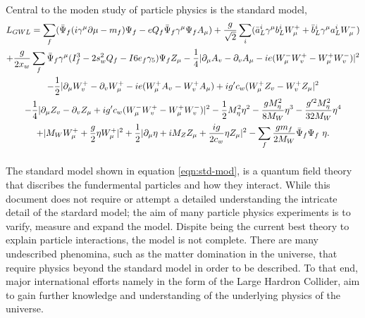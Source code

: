     Central to the moden study of particle physics is the standard model,
    \begin{multline} \label{eqn:std-mod}
      L_{GWL} = \sum_{f} ( \bar{\Psi}_{f} ( i \gamma^\mu \partial \mu - m_{f} ) \Psi_{f} - eQ_{f} \bar{\Psi}_{f} \gamma^\mu \Psi_{f} A_{\mu} ) + \frac{g}{\sqrt{2}} \sum_{i} ( \bar{a}^i_L \gamma^\mu b^i_L W^+_\mu + \bar{b}^i_L \gamma^\mu a^i_L W^-_\mu )                        \\                           
              + \frac{g}{2x_w} \sum_f \bar{\Psi}_f \gamma^\mu ( I^3_f - 2s^2_w Q_f - I6e_f \gamma_5 ) \Psi_f Z_\mu - \frac{1}{4} | \partial_\mu A_v - \partial_v A_\mu - ie(W^-_\mu W^+_v - W^+_\mu W^-_v ) |^2                                         \\                                     
              - \frac{1}{2} | \partial_\mu W^+_v - \partial_v W^+_\mu - ie ( W^+_\mu A_v - W^+_v A_\mu ) + ig' c_w (W^+_\mu Z_v - W^+_v Z_\mu |^2 \\
              - \frac{1}{4} | \partial_\mu Z_v - \partial_v Z_\mu + ig' c_w (W^-_\mu W^+_v - W^+_\mu W^-_v ) |^2 - \frac{1}{2} M^2_\eta \eta^2  - \frac{gM^2_\eta}{8M_W} \eta^3  - \frac{g'^2 M^2_\eta}{32M_W}\eta^4    \\     
              + | M_W W^+_\mu + \frac{g}{2} \eta W^+_\mu |^2 + \frac{1}{2} | \partial_\mu \eta + i M_Z Z_\mu + \frac{ig}{2c_w} \eta Z_\mu |^2 - \sum_f \frac{g m_f}{2 M_W} \bar{\Psi}_f \Psi_f\ \eta. 
              \vspace{1em}                                                                               
    \end{multline}
    The standard model shown in equation \ref{eqn:std-mod}, is a quantum field theory that discribes the fundermental particles and how they interact.
    While this document does not require or attempt a detailed understanding the intricate detail of the stardard model;
    the aim of many particle physics experiments is to varify, measure and expand the model.
    Dispite being the current best theory to explain particle interactions, the model is not complete.
    There are many undescribed phenomina, such as the matter domination in the universe, that require physics beyond the standard model in order to be described.
    To that end, major international efforts namely in the form of the Large Hardron Collider, aim to gain further knowledge and understanding of the underlying physics of the universe. \cite{ref:std}

